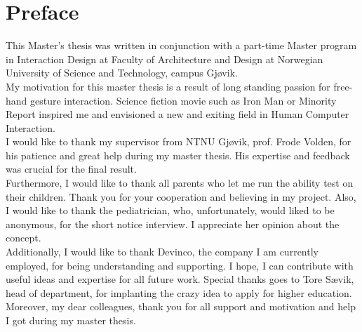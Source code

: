 \hypersetup{pageanchor=false}
%

\chapter*{Preface}



This Master's thesis was written in conjunction with a part-time Master program in Interaction Design at Faculty of Architecture and Design at Norwegian University of Science and Technology, campus Gjøvik.\\%

My motivation for this master thesis is a result of long standing passion for free-hand gesture interaction. Science fiction movie such as Iron Man or Minority Report inspired me and envisioned a new and exiting field in Human Computer Interaction.\\


I would like to thank my supervisor from NTNU Gjøvik, prof. Frode Volden, for his patience and great help during my master thesis. His expertise and feedback was crucial for the final result.\\

Furthermore, I would like to thank all parents who let me run the ability test on their children. Thank you for your cooperation and believing in my project. 
Also, I would like to thank the pediatrician, who, unfortunately, would liked to be anonymous,  for the short notice interview. I appreciate her opinion about the concept.\\

Additionally, I would like to thank Devinco, the company I am currently employed, for being understanding and supporting. I hope, I can contribute with useful ideas and expertise for all future work. Special thanks goes to Tore Sævik, head of department, for implanting the crazy idea to apply for higher education. Moreover, my dear colleagues, thank you for all support and motivation and help I got during my master thesis. \\

